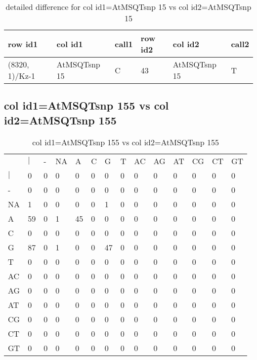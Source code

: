 \begin{center}
\begin{longtable}{|l|l|l|l|l|l|}
\caption{detailed difference for col id1=AtMSQTsnp 15 vs col id2=AtMSQTsnp 15} \label{table_dm531}\\
\hline
row id1&col id1&call1&row id2&col id2&call2\\
\hline
(8320, 1)/Kz-1&AtMSQTsnp 15&C&43&AtMSQTsnp 15&T\\
\hline
\end{longtable}
\end{center}

\subsection{col id1=AtMSQTsnp 155 vs col id2=AtMSQTsnp 155}
\begin{center}
\begin{longtable}{|l|l|l|l|l|l|l|l|l|l|l|l|l|l|}
\caption{col id1=AtMSQTsnp 155 vs col id2=AtMSQTsnp 155} \label{table_dm532}\\
\hline
\\
\hline
&$|$&-&NA&A&C&G&T&AC&AG&AT&CG&CT&GT\\
$|$&0&0&0&0&0&0&0&0&0&0&0&0&0\\
-&0&0&0&0&0&0&0&0&0&0&0&0&0\\
NA&1&0&0&0&0&1&0&0&0&0&0&0&0\\
A&59&0&1&45&0&0&0&0&0&0&0&0&0\\
C&0&0&0&0&0&0&0&0&0&0&0&0&0\\
G&87&0&1&0&0&47&0&0&0&0&0&0&0\\
T&0&0&0&0&0&0&0&0&0&0&0&0&0\\
AC&0&0&0&0&0&0&0&0&0&0&0&0&0\\
AG&0&0&0&0&0&0&0&0&0&0&0&0&0\\
AT&0&0&0&0&0&0&0&0&0&0&0&0&0\\
CG&0&0&0&0&0&0&0&0&0&0&0&0&0\\
CT&0&0&0&0&0&0&0&0&0&0&0&0&0\\
GT&0&0&0&0&0&0&0&0&0&0&0&0&0\\
\hline
\end{longtable}
\end{center}

